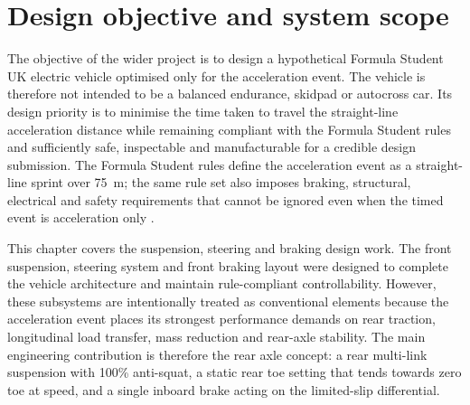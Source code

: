 
\newcommand{\checkme}[1]{\par\noindent\textbf{FACT-CHECK / TEAM INPUT REQUIRED:} #1\par}
\newcommand{\figbox}[2]{\begin{figure}[H]\centering\fbox{\parbox[c][#1][c]{0.92\linewidth}{\centering #2}}\caption{#2}\end{figure}}

\section{Design objective and system scope}

The objective of the wider project is to design a hypothetical Formula Student UK electric vehicle optimised only for the acceleration event. The vehicle is therefore not intended to be a balanced endurance, skidpad or autocross car. Its design priority is to minimise the time taken to travel the straight-line acceleration distance while remaining compliant with the Formula Student rules and sufficiently safe, inspectable and manufacturable for a credible design submission. The Formula Student rules define the acceleration event as a straight-line sprint over \SI{75}{m}; the same rule set also imposes braking, structural, electrical and safety requirements that cannot be ignored even when the timed event is acceleration only \parencite{imecheFS2026Rules}.

This chapter covers the suspension, steering and braking design work. The front suspension, steering system and front braking layout were designed to complete the vehicle architecture and maintain rule-compliant controllability. However, these subsystems are intentionally treated as conventional elements because the acceleration event places its strongest performance demands on rear traction, longitudinal load transfer, mass reduction and rear-axle stability. The main engineering contribution is therefore the rear axle concept: a rear multi-link suspension with 100\% anti-squat, a static rear toe setting that tends towards zero toe at speed, and a single inboard brake acting on the limited-slip differential.

